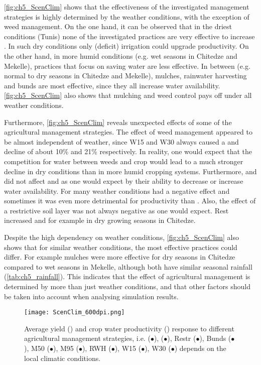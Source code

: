 \autoref{fig:ch5_ScenClim} shows that the effectiveness of the investigated management strategies is highly determined by the weather conditions, with the exception of weed management. On the one hand, it can be observed that in the driest conditions (Tunis) none of the investigated practices are very effective to increase \Y. In such dry conditions only (deficit) irrigation could upgrade productivity. On the other hand, in more humid conditions (e.g. wet seasons in Chitedze and Mekelle), practices that focus on saving water are less effective. In between (e.g. normal to dry seasons in Chitedze and Mekelle), mulches, rainwater harvesting and bunds are most effective, since they all increase water availability. \autoref{fig:ch5_ScenClim} also shows that mulching and weed control pays off under all weather conditions. 

Furthermore, \autoref{fig:ch5_ScenClim} reveals unexpected effects of some of the agricultural management strategies. The effect of weed management appeared to be almost independent of weather, since W15 and W30 always caused a \Y and \WPET decline of about 10\% and 21\% respectively. In reality, one would expect that the competition for water between weeds and crop would lead to a much stronger \Y decline in dry conditions than in more humid cropping systems. Furthermore, \TAWm and \TAWp did not affect \Y and \WPET as one would expect by their ability to decrease or increase water availability. For many weather conditions \TAWp had a negative effect and sometimes it was even more detrimental for productivity than \TAWm. Also, the effect of a restrictive soil layer was not always negative as one would expect. Rest increased \Y and \WPET for example in dry growing seasons in Chitedze. 

Despite the high dependency on weather conditions, \autoref{fig:ch5_ScenClim} also shows that for similar weather conditions, the most effective practices could differ. For example mulches were more effective for dry seasons in Chitedze compared to wet seasons in Mekelle, although both have similar seasonal rainfall (\autoref{tab:ch5_rainfall}). This indicates that the effect of agricultural management is determined by more than just weather conditions, and that other factors should be taken into account when analysing simulation results.

\begin{figure}[tbhp]
	\centering
		\texttt{[image: ScenClim\_600dpi.png]}
	\caption{Average yield (\Y) and crop water productivity (\WPET) response to different agricultural management strategies, i.e. \TAWm (\textcolor{tawm}{$\bullet$}), \TAWp (\textcolor{tawp}{$\bullet$}), Restr (\textcolor{rest}{$\bullet$}), Bunds  (\textcolor{bunds}{$\bullet$}), M50 (\textcolor{m50}{$\bullet$}), M95 (\textcolor{m95}{$\bullet$}), RWH (\textcolor{rwh}{$\bullet$}), W15 (\textcolor{w15}{$\bullet$}), W30 (\textcolor{w30}{$\bullet$}) depends on the local climatic conditions.}
	\label{fig:ch5_ScenClim}
\end{figure}

